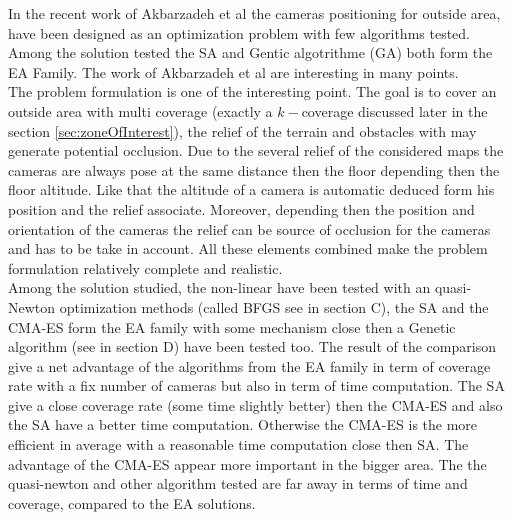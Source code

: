 In the recent work of Akbarzadeh et al \cite{141*akbarzadeh2013} the cameras positioning for outside area, have been designed as an optimization problem with few algorithms tested. Among the solution tested the SA and Gentic algotrithme (GA) both form the EA Family. 
The work of Akbarzadeh et al \cite{141*akbarzadeh2013} are interesting in many points. \\
The problem formulation is one of the interesting point. The goal is to cover an outside area with  multi coverage (exactly a $k-$coverage  discussed later in the  section \ref{sec:zoneOfInterest}), the relief of the terrain and obstacles with may generate potential occlusion. 
Due to the several relief of the considered maps the cameras  are always pose at the same distance then the floor  depending then the floor altitude. Like that the altitude of a camera is automatic deduced form his position and the relief associate. Moreover, depending then the position and orientation of the cameras the relief can be source of occlusion for the cameras and has to be take in account.
  All these elements combined make the problem formulation relatively complete and realistic.\\
 Among the solution studied, the non-linear have been tested with an quasi-Newton optimization methods (called BFGS see in \cite{141*akbarzadeh2013} section C), the SA and the CMA-ES  form the EA family with some mechanism close then a Genetic algorithm (see in \cite{141*akbarzadeh2013} section D) have been tested too.
The result of the comparison give a net advantage of the algorithms from the EA family in term of coverage rate with a fix number of cameras but also in term of time computation. 
 The SA give a close coverage rate (some time slightly better) then the CMA-ES and also the SA have a better time computation. Otherwise the CMA-ES is the more efficient in average with a reasonable time computation close then SA. The advantage of the CMA-ES appear more important in the bigger area. The the quasi-newton and other algorithm tested are far away in terms of time and coverage, compared to the EA solutions.\\
 
